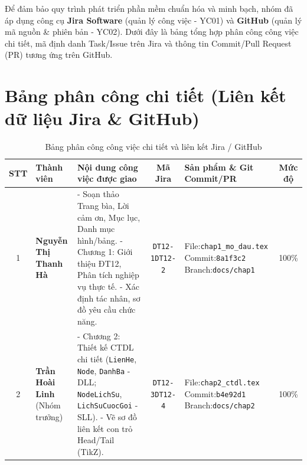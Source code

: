 \documentclass[12pt,a4paper]{report}
\begin{document}
Để đảm bảo quy trình phát triển phần mềm chuẩn hóa và minh bạch, nhóm đã áp dụng công cụ \textbf{Jira Software} (quản lý công việc - YC01) và \textbf{GitHub} (quản lý mã nguồn \& phiên bản - YC02). Dưới đây là bảng tổng hợp phân công công việc chi tiết, mã định danh Task/Issue trên Jira và thông tin Commit/Pull Request (PR) tương ứng trên GitHub.

\section*{Bảng phân công chi tiết (Liên kết dữ liệu Jira \& GitHub)}

\begin{table}[H]
\centering
\small
\caption{Bảng phân công công việc chi tiết và liên kết Jira / GitHub}
\label{tab:phan_cong_cong_viec}
\begin{tabularx}{\textwidth}{|c|>{\raggedright\arraybackslash}p{2.0cm}|X|c|>{\raggedright\arraybackslash}p{2.7cm}|c|}
\hline
\textbf{STT} & \textbf{Thành viên} & \textbf{Nội dung công việc được giao} & \textbf{Mã Jira} & \textbf{Sản phẩm \& Git Commit/PR} & \textbf{Mức độ} \\ \hline

1 & \textbf{Nguyễn Thị Thanh Hà} 
  & - Soạn thảo Trang bìa, Lời cảm ơn, Mục lục, Danh mục hình/bảng.\newline
    - Chương 1: Giới thiệu ĐT12, Phân tích nghiệp vụ thực tế.\newline
    - Xác định tác nhân, sơ đồ yêu cầu chức năng.
  & \texttt{DT12-1}\newline \texttt{DT12-2}
  & File:\newline \texttt{\small chap1\_mo\_dau.tex}\newline
    Commit:\newline \texttt{\small 8a1f3c2}\newline
    Branch:\newline \texttt{\small docs/chap1}
  & 100\% \\ \hline

2 & \textbf{Trần Hoài Linh} \newline (Nhóm trưởng) 
  & - Chương 2: Thiết kế CTDL chi tiết (\texttt{LienHe}, \texttt{Node}, \texttt{DanhBa} - DLL; \texttt{NodeLichSu}, \texttt{LichSuCuocGoi} - SLL).\newline
    - Vẽ sơ đồ liên kết con trỏ Head/Tail (TikZ).
  & \texttt{DT12-3}\newline \texttt{DT12-4}
  & File:\newline \texttt{\small chap2\_ctdl.tex}\newline
    Commit:\newline \texttt{\small b4e92d1}\newline
    Branch:\newline \texttt{\small docs/chap2}
  & 100\% \\ \hline


\end{tabularx}
\end{table}
\end{document}
